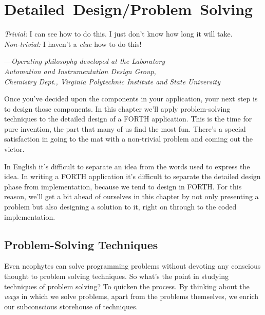 

\chapter{Detailed~Design/\allowhyphens Problem~Solving}

\begin{tfquot}
\emph{Trivial:} I can see how to do this. I just don't know how long it
will take.\\
\emph{Non-trivial:} I haven't a \emph{clue} how to do this!

\begin{raggedleft}
---\emph{Operating philosophy developed at the Laboratory\\
Automation and Instrumentation Design Group,\\
Chemistry Dept., Virginia Polytechnic Institute and State University}\\
\end{raggedleft}
\end{tfquot}

Once you've decided upon the components in your application, your next
step is to design those components. In this chapter we'll apply
problem-solving techniques to the detailed design of a FORTH application.
This is the time for pure invention, the part that many of us find the most
fun. There's a special satisfaction in going to the mat with a non-trivial
problem and coming out the victor.

In English it's difficult to separate an idea from the words used to
express the idea. In writing a FORTH application it's difficult to
separate the detailed design phase from implementation, because we tend
to design in FORTH. For this reason, we'll get a bit ahead of ourselves in
this chapter by not only presenting a problem but also designing a solution
to it, right on through to the coded implementation.

\section{Problem-Solving Techniques}

Even neophytes can solve programming problems without devoting any
conscious thought to problem solving techniques. So what's the point in
studying techniques of problem solving? To quicken the process. By
thinking about the \emph{ways} in which we solve problems, apart from
the problems themselves, we enrich our subconscious storehouse of
techniques.

